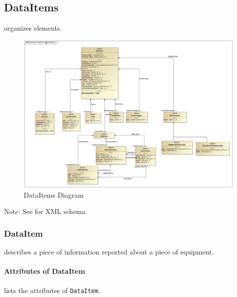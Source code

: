 \subsection{DataItems} \label{sec:DataItems}


 \glspl{organize}  elements.

\begin{figure}[ht]
  \centering
    \includegraphics[width=1.0\textwidth]{figures/DataItems.png}
  \caption{DataItems Diagram}
  \label{fig:DataItems Diagram}
\end{figure}

\FloatBarrier


Note: See  for XML schema.


\subsubsection{DataItem}
\label{sec:DataItem}



 describes a piece of information reported about a piece of equipment.


\paragraph{Attributes of DataItem}\mbox{}
\label{sec:Attributes of DataItem}

 lists the attributes of \texttt{DataItem}.


